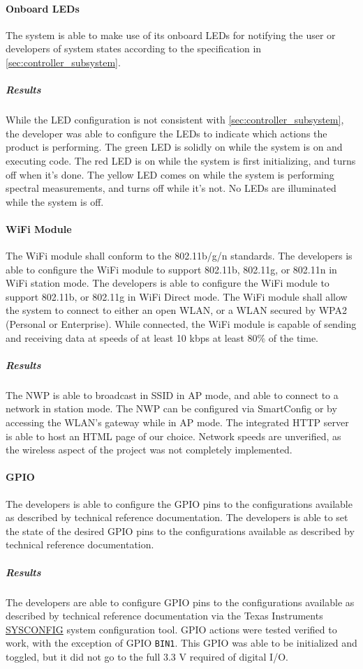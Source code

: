 \paragraph{Onboard LEDs} The system is able to make use of its onboard
LEDs for notifying the user or developers of system states according to the specification in \autoref{sec:controller_subsystem}.
\subparagraph{Results} While the LED configuration is not consistent with \autoref{sec:controller_subsystem}, the developer was able to configure the LEDs to indicate which actions the product is performing. The green LED is solidly on while the system is on and executing code. The red LED is on while the system is first initializing, and turns off when it's done. The yellow LED comes on while the system is performing spectral measurements, and turns off while it's not. No LEDs are illuminated while the system is off.

\paragraph{WiFi Module} The WiFi module shall conform to the 802.11b/g/n
standards. The developers is able to configure the WiFi
module to support 802.11b, 802.11g, or 802.11n in WiFi station mode.  The 
developers is able to configure the WiFi module to support 802.11b, or
802.11g in WiFi Direct mode. The WiFi module shall allow the system to
connect to either an open WLAN, or a WLAN secured by WPA2 (Personal or
Enterprise). While
connected, the WiFi module is capable of sending and receiving
data at speeds of at least 10 kbps at least 80\% of the time.
\subparagraph{Results} The NWP is able to broadcast in SSID in AP mode, and able to connect to a network in station mode. The NWP can be configured via SmartConfig or by accessing the WLAN's gateway while in AP mode. The integrated HTTP server is able to host an HTML page of our choice. Network speeds are unverified, as the wireless aspect of the project was not completely implemented.

\paragraph{GPIO} The developers is able to configure the GPIO pins to
the configurations available as described by technical reference documentation.
The developers is able to set the state of the desired GPIO pins to
the configurations available as described by technical reference documentation.
\subparagraph{Results} The developers are able to configure GPIO pins to the configurations available as described by technical reference documentation via the Texas Instruments \href{https://www.ti.com/tool/SYSCONFIG}{SYSCONFIG} system configuration tool. GPIO actions were tested verified to work, with the exception of GPIO \texttt{BIN1}. This GPIO was able to be initialized and toggled, but it did not go to the full 3.3 V required of digital I/O.

